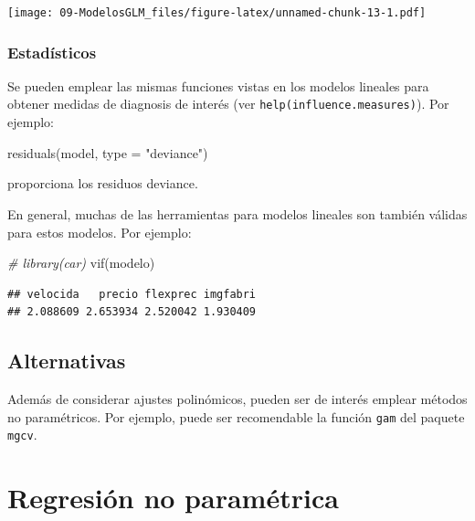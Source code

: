 \documentclass[
]{book}
\newenvironment{Shaded}{\begin{snugshade}}{\end{snugshade}}
\newcommand{\AttributeTok}[1]{\textcolor[rgb]{0.77,0.63,0.00}{#1}}
\newcommand{\CommentTok}[1]{\textcolor[rgb]{0.56,0.35,0.01}{\textit{#1}}}
\newcommand{\FunctionTok}[1]{\textcolor[rgb]{0.00,0.00,0.00}{#1}}
\newcommand{\NormalTok}[1]{#1}
\newcommand{\StringTok}[1]{\textcolor[rgb]{0.31,0.60,0.02}{#1}}
\theoremstyle{break}
\begin{document}
\texttt{[image: 09-ModelosGLM\_files/figure-latex/unnamed-chunk-13-1.pdf]}

\hypertarget{estaduxedsticos-1}{%
\subsection{Estadísticos}\label{estaduxedsticos-1}}

Se pueden emplear las mismas funciones vistas en los modelos lineales para obtener medidas de diagnosis de interés (ver \texttt{help(influence.measures)}). Por ejemplo:

\begin{Shaded}
\begin{Highlighting}[]
\FunctionTok{residuals}\NormalTok{(model, }\AttributeTok{type =} \StringTok{"deviance"}\NormalTok{) }
\end{Highlighting}
\end{Shaded}

proporciona los residuos deviance.

En general, muchas de las herramientas para modelos lineales son también válidas para estos modelos. Por ejemplo:

\begin{Shaded}
\begin{Highlighting}[]
\CommentTok{\# library(car)}
\FunctionTok{vif}\NormalTok{(modelo)}
\end{Highlighting}
\end{Shaded}

\begin{verbatim}
## velocida   precio flexprec imgfabri 
## 2.088609 2.653934 2.520042 1.930409
\end{verbatim}

\hypertarget{alternativas-1}{%
\section{Alternativas}\label{alternativas-1}}

Además de considerar ajustes polinómicos, pueden ser de interés emplear métodos no paramétricos. Por ejemplo, puede ser recomendable la función \texttt{gam} del paquete \texttt{mgcv}.

\hypertarget{regresiuxf3n-no-paramuxe9trica}{%
\chapter{Regresión no paramétrica}\label{regresiuxf3n-no-paramuxe9trica}}
\end{document}
